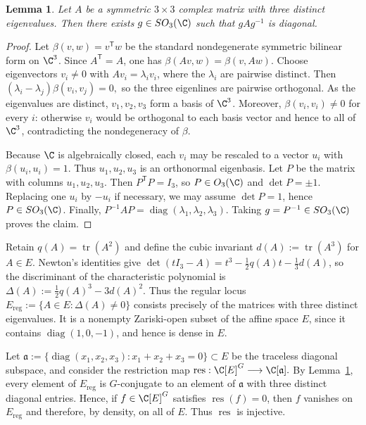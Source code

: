\documentclass[12pt,leqno]{amsart}
\numberwithin{equation}{section} \newtheorem{thm}{Theorem}[section] \newtheorem{lem}[thm]{Lemma} \newtheorem{ex}[thm]{Example} \newtheorem{prop}[thm]{Proposition} \newtheorem{cor}[thm]{Corollary} \newtheorem{defi}[thm]{Definition} \newtheorem{rmk}[thm]{Remark} \newtheorem{notation}[thm]{Notation}
\begin{document}
\begin{lem}\label{lem:complex-symmetric}
Let $A$ be a symmetric $3\times3$ complex matrix with three distinct eigenvalues. Then there exists $g\in SO_3(\C)$ such that $gAg^{-1}$ is diagonal.
\end{lem}

\begin{proof}
Let $\beta(v,w)=v^{\mathsf T}w$ be the standard nondegenerate symmetric bilinear form on $\C^3$. Since $A^{\mathsf T}=A$, one has $\beta(Av,w)=\beta(v,Aw)$. Choose eigenvectors $v_i\ne0$ with $Av_i=\lambda_i v_i$, where the $\lambda_i$ are pairwise distinct. Then \((\lambda_i-\lambda_j)\beta(v_i,v_j)=0,\) so the three eigenlines are pairwise orthogonal. As the eigenvalues are distinct, $v_1,v_2,v_3$ form a basis of $\C^3$. Moreover, $\beta(v_i,v_i)\ne0$ for every $i$: otherwise $v_i$ would be orthogonal to each basis vector and hence to all of $\C^3$, contradicting the nondegeneracy of $\beta$.

Because $\C$ is algebraically closed, each $v_i$ may be rescaled to a vector $u_i$ with $\beta(u_i,u_i)=1$. Thus $u_1,u_2,u_3$ is an orthonormal eigenbasis. Let $P$ be the matrix with columns $u_1,u_2,u_3$. Then $P^{\mathsf T}P=I_3$, so $P\in O_3(\C)$ and $\det P=\pm1$. Replacing one $u_i$ by $-u_i$ if necessary, we may assume $\det P=1$, hence $P\in SO_3(\C)$. Finally, \(P^{-1}AP=\operatorname{diag}(\lambda_1,\lambda_2,\lambda_3).\) Taking $g=P^{-1}\in SO_3(\C)$ proves the claim.
\end{proof}

Retain $q(A)=\operatorname{tr}(A^2)$ and define the cubic invariant \(d(A):=\operatorname{tr}(A^3)\) for $A\in E$. Newton's identities give \(\det(tI_3-A)=t^3-\frac12q(A)t-\frac13d(A)\), so the discriminant of the characteristic polynomial is \(\Delta(A):=\frac12q(A)^3-3d(A)^2.\) Thus the regular locus \(E_{\mathrm{reg}}:=\{A\in E:\Delta(A)\ne0\}\) consists precisely of the matrices with three distinct eigenvalues. It is a nonempty Zariski-open subset of the affine space $E$, since it contains $\operatorname{diag}(1,0,-1)$, and hence is dense in $E$.

Let \(\mathfrak a :=\{\operatorname{diag}(x_1,x_2,x_3):x_1+x_2+x_3=0\} \subset E\) be the traceless diagonal subspace, and consider the restriction map \(\operatorname{res}:\C[E]^G\longrightarrow\C[\mathfrak a].\) By Lemma~\ref{lem:complex-symmetric}, every element of $E_{\mathrm{reg}}$ is $G$-conjugate to an element of $\mathfrak a$ with three distinct diagonal entries. Hence, if $f\in\C[E]^G$ satisfies $\operatorname{res}(f)=0$, then $f$ vanishes on $E_{\mathrm{reg}}$ and therefore, by density, on all of $E$. Thus $\operatorname{res}$ is injective.
\end{document}
